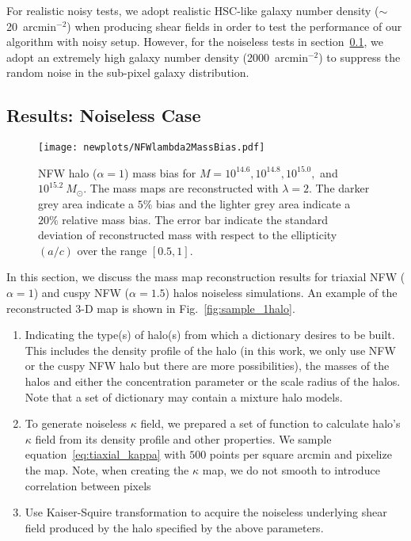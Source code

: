 \documentclass[twocolumn, usenames, dvipsnames]{aastex63}
\begin{document}
For realistic noisy tests, we adopt realistic HSC-like galaxy number density
($\sim$20~arcmin$^{-2}$) \citep{HSC1-catalog, HSC3_catalog} when producing
shear fields in order to test the performance of our algorithm with noisy
setup. However, for the noiseless tests in section~\ref{sec:oneHalo_noiseless},
we adopt an extremely high galaxy number density (2000~arcmin$^{-2}$) to
suppress the random noise in the sub-pixel galaxy distribution.

\subsection{Results: Noiseless Case}
\label{sec:oneHalo_noiseless}

\begin{figure*}
\centering
\texttt{[image: newplots/NFWlambda2MassBias.pdf]}
\caption{
    NFW halo ($\alpha=1$) mass bias for $M=10^{14.6}, 10^{14.8}, 10^{15.0},$
    and $ 10^{15.2}~M_{\odot}$. The mass maps are reconstructed with
    $\lambda=2$. The darker grey area indicate a $5\%$ bias and the lighter
    grey area indicate a $20\%$ relative mass bias. The error bar indicate the
    standard deviation of reconstructed mass with respect to the ellipticity
    $(a/c)$ over the range $[0.5,1]$.
    }
\label{NoisyMassBiasNFWlambda2}
\end{figure*}

In this section, we discuss the mass map reconstruction results for triaxial
NFW ($\alpha = 1$) and cuspy NFW ($\alpha = 1.5$) halos noiseless simulations.
An example of the reconstructed 3-D map is shown in
Fig.~\ref{fig:sample_1halo}.

\begin{enumerate}
    \item Indicating the type(s) of halo(s) from which a dictionary desires to
        be built. This includes the density profile of the halo (in this work,
        we only use NFW or the cuspy NFW halo but there are more
        possibilities), the masses of the halos and either the concentration
        parameter or the scale radius of the halos. Note that a set of
        dictionary may contain a mixture halo models.
    \item  To generate noiseless $\kappa$ field, we prepared a set of function
        to calculate halo's $\kappa$ field from its density profile and other
        properties. We sample equation~\eqref{eq:tiaxial_kappa} with $500$
        points per square arcmin and pixelize the map. Note, when creating the
        $\kappa$ map, we do not smooth to introduce correlation between pixels
    \item Use Kaiser-Squire \citep{massMap_KS1993} transformation to acquire
        the noiseless underlying shear field produced by the halo specified by
        the above parameters.
\end{enumerate}
\end{document}

